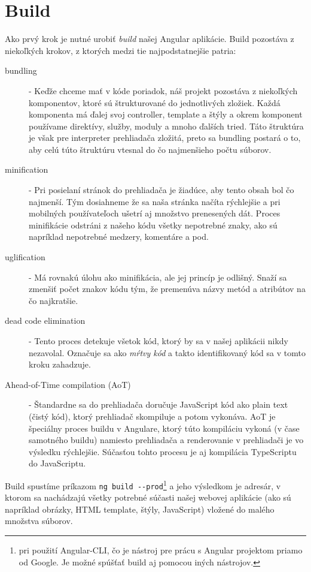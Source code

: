 \documentclass[
  digital, %
  twoside, %
  notable,   %
  nolof,   %
  nolot,   %
]{fithesis3}
\begin{document}
\section{Build}
Ako prvý krok je nutné urobiť \textit{build} našej Angular aplikácie. Build pozostáva z niekoľkých krokov, z ktorých medzi tie najpodstatnejšie patria:
\begin{description}
\item[bundling] - Keďže chceme mať v kóde poriadok, náš projekt pozostáva z niekoľkých komponentov, ktoré sú štrukturované do jednotlivých zložiek. Každá komponenta má ďalej svoj controller, template a štýly a okrem komponent používame direktívy, služby, moduly a mnoho ďalších tried. Táto štruktúra je však pre interpreter prehliadača zložitá, preto sa bundling postará o to, aby celú túto štruktúru vtesnal do čo najmenšieho počtu súborov.
\item[minification] - Pri posielaní stránok do prehliadača je žiadúce, aby tento obsah bol čo najmenší. Tým dosiahneme že sa naša stránka načíta rýchlejšie a pri mobilných používateľoch ušetrí aj množstvo prenesených dát. Proces minifikácie odstráni z našeho kódu všetky nepotrebné znaky, ako sú napríklad nepotrebné medzery, komentáre a pod.
\item[uglification] - Má rovnakú úlohu ako minifikácia, ale jej princíp je odlišný. Snaží sa zmenšiť počet znakov kódu tým, že premenúva názvy metód a atribútov na čo najkratšie.
\item[dead code elimination] - Tento proces detekuje všetok kód, ktorý by sa v našej aplikácii nikdy nezavolal. Označuje sa ako \textit{mŕtvy kód} a takto identifikovaný kód sa v tomto kroku zahadzuje.
\item[Ahead-of-Time compilation (AoT)] - Štandardne sa do prehliadača doručuje JavaScript kód ako plain text (čistý kód), ktorý prehliadač skompiluje a potom vykonáva. AoT je špeciálny proces buildu v Angulare, ktorý túto kompiláciu vykoná (v čase samotného buildu) namiesto prehliadača a renderovanie v prehliadači je vo výsledku rýchlejšie. Súčasťou tohto procesu je aj kompilácia TypeScriptu do JavaScriptu.
\end{description}

Build spustíme príkazom \texttt{ng build -{}-prod}\footnote{pri použití Angular-CLI, čo je nástroj pre prácu s Angular projektom priamo od Google. Je možné spúšťať build aj pomocou iných nástrojov.} a jeho výsledkom je adresár, v ktorom sa nachádzajú všetky potrebné súčasti našej webovej aplikácie (ako sú napríklad obrázky, HTML template, štýly, JavaScript) vložené do malého množstva súborov.
\end{document}
